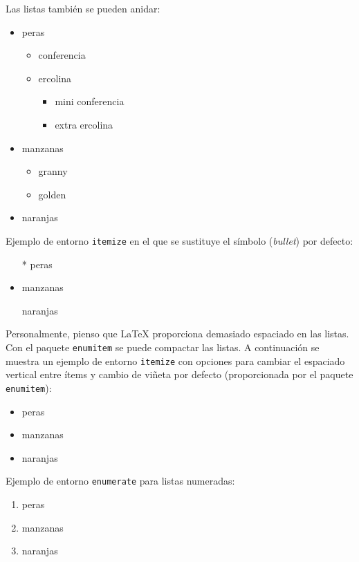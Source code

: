 Las listas también se pueden anidar:
\begin{itemize}
	\item peras
	\begin{itemize}
		\item conferencia
		\item ercolina
    	\begin{itemize}
    		\item mini conferencia
    		\item extra ercolina
    	\end{itemize}
	\end{itemize}
	\item manzanas
	\begin{itemize}
		\item granny
		\item golden 
	\end{itemize}
	\item naranjas
\end{itemize}


\noindent Ejemplo de entorno {\tt itemize} en el que se sustituye el símbolo (\emph{bullet}) por defecto:

\begin{itemize}
	\item[*] peras
	\item manzanas
	\item[\ding{170}] naranjas
\end{itemize}


Personalmente, pienso que \LaTeX{} proporciona demasiado espaciado en las listas. Con el paquete \texttt{enumitem} se puede compactar las listas. A continuación se muestra un ejemplo de entorno {\tt itemize} con opciones para cambiar el espaciado vertical entre ítems y cambio de viñeta por defecto (proporcionada por el paquete \texttt{enumitem}):

\begin{itemize}[*,noitemsep]
	\item peras
	\item manzanas
	\item naranjas
\end{itemize}

\noindent Ejemplo de entorno {\tt enumerate} para listas numeradas:

\begin{enumerate}
	\item peras
	\item manzanas
	\item naranjas
\end{enumerate}


